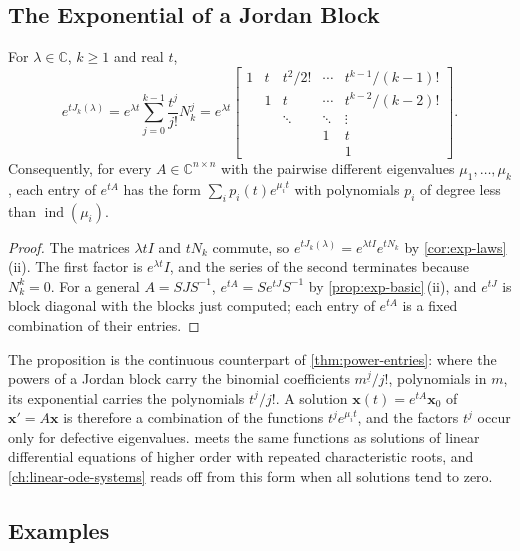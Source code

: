 \subsection{The Exponential of a Jordan Block}

\begin{proposition}
\label{prop:exp-jordan}
For $\lambda\in\mathbb C$, $k\ge1$ and real $t$,
\[
e^{tJ_k(\lambda)}=e^{\lambda t}\sum_{j=0}^{k-1}\frac{t^j}{j!}N_k^j=e^{\lambda t}\begin{bmatrix}1&t&t^2/2!&\cdots&t^{k-1}/(k-1)!\\&1&t&\cdots&t^{k-2}/(k-2)!\\&&\ddots&\ddots&\vdots\\&&&1&t\\&&&&1\end{bmatrix}.
\]
Consequently, for every $A\in\mathbb C^{n\times n}$ with the pairwise different eigenvalues $\mu_1,\ldots,\mu_k$, each entry of $e^{tA}$ has the form $\sum_ip_i(t)e^{\mu_it}$ with polynomials $p_i$ of degree less than $\operatorname{ind}(\mu_i)$.
\end{proposition}

\begin{proof}
The matrices $\lambda tI$ and $tN_k$ commute, so $e^{tJ_k(\lambda)}=e^{\lambda tI}e^{tN_k}$ by \cref{cor:exp-laws}\,(ii). The first factor is $e^{\lambda t}I$, and the series of the second terminates because $N_k^k=0$. For a general $A=SJS^{-1}$, $e^{tA}=Se^{tJ}S^{-1}$ by \cref{prop:exp-basic}\,(ii), and $e^{tJ}$ is block diagonal with the blocks just computed; each entry of $e^{tA}$ is a fixed combination of their entries.
\end{proof}

The proposition is the continuous counterpart of \cref{thm:power-entries}: where the powers of a Jordan block carry the binomial coefficients $m^{\underline j}/j!$, polynomials in $m$, its exponential carries the polynomials $t^j/j!$. A solution $\mathbf x(t)=e^{tA}\mathbf x_0$ of $\mathbf x'=A\mathbf x$ is therefore a combination of the functions $t^je^{\mu_it}$, and the factors $t^j$ occur only for defective eigenvalues.  meets the same functions as solutions of linear differential equations of higher order with repeated characteristic roots, and \cref{ch:linear-ode-systems} reads off from this form when all solutions tend to zero.

\subsection{Examples}

